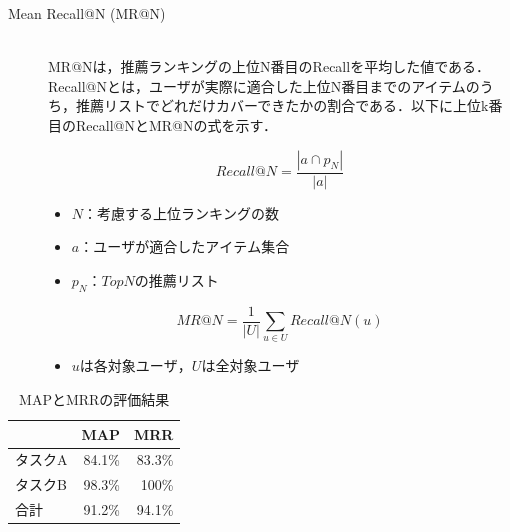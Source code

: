\documentclass[12pt]{jarticle} %
\begin{document}
\begin{description}

\item[Mean Recall@N (MR@N)]~\\
MR@Nは，推薦ランキングの上位N番目のRecallを平均した値である．Recall@Nとは，ユーザが実際に適合した上位N番目までのアイテムのうち，推薦リストでどれだけカバーできたかの割合である．以下に上位k番目のRecall@NとMR@Nの式を示す．

\[
  Recall@N =
  \frac{|a \cap p_N|}{|a|}
\]
\begin{itemize}
\item $N：考慮する上位ランキングの数$
\item $a：ユーザが適合したアイテム集合$
\item $p_N：TopNの推薦リスト$
\end{itemize}

\[
  MR@N =
  \frac{1}{|U|}\sum_{u\in U} Recall@N(u)
\]
\begin{itemize}
\item $uは各対象ユーザ，Uは全対象ユーザ$
\end{itemize}

\end{description}


\begin{table}[h]
\caption{MAPとMRRの評価結果}
\label{map}
\begin{center}
\begin{tabular}{|p{3cm}|p{3cm}|p{3cm}|}
\hline \hline
\multicolumn{1}{|r|}{} & \multicolumn{1}{p{3cm}|}{MAP} & \multicolumn{1}{p{3cm}|}{MRR} \\ \hline
タスクA & \multicolumn{1}{r|}{84.1\%} & \multicolumn{1}{r|}{83.3\%} \\ \hline
タスクB & \multicolumn{1}{r|}{98.3\%} & \multicolumn{1}{r|}{100\%} \\ \hline
合計 & \multicolumn{1}{r|}{91.2\%} & \multicolumn{1}{r|}{94.1\%} \\ \hline
\end{tabular}
\end{center}
\end{table}
\end{document}
